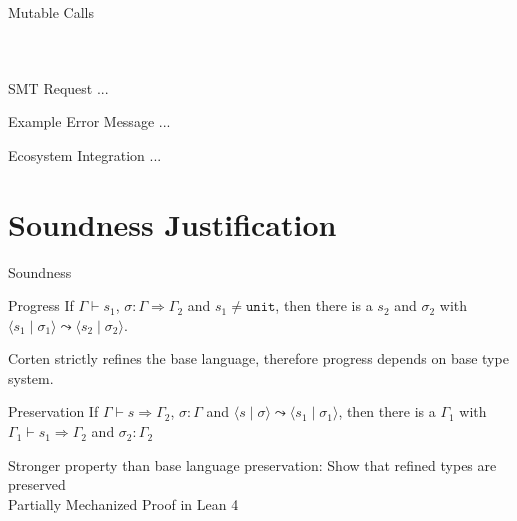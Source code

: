 \documentclass{sdqbeamer}
\newcommand{\code}[1]{\texttt{#1}}
\newcommand{\tuple}[2]{\langle #1 \mid #2 \rangle}
\begin{document}
\begin{frame}[fragile]{Mutable Calls}
  \begin{columns}
    \inputminted[]{rust}{./snippets/mut-arg-caller.rs}
    
  \end{columns}
\end{frame}

\begin{frame}{SMT Request}
  ...
\end{frame}


\begin{frame}{Example Error Message}
  ...
\end{frame}


\begin{frame}{Ecosystem Integration}
  ...
\end{frame}

\section{Soundness Justification}

\begin{frame}[fragile]{Soundness}
  \begin{greenblock}{Progress}
    If $\Gamma \vdash s_1$, $\sigma : \Gamma \Rightarrow \Gamma_2$ and $s_1 \neq \code{unit}$, then there is a $s_2$ and $\sigma_2$ with $\tuple{s_1}{\sigma_1} \leadsto \tuple{s_2}{\sigma_2}$.
  \end{greenblock}

  Corten strictly refines the base language, therefore progress depends on base type system.

  \begin{greenblock}{Preservation}
    If $\Gamma \vdash s \Rightarrow \Gamma_2$, $\sigma : \Gamma$ and $\tuple{s}{\sigma} \leadsto \tuple{s_1}{\sigma_1}$, then there is a $\Gamma_1$ with $\Gamma_1 \vdash s_1 \Rightarrow \Gamma_2$ and $\sigma_2 : \Gamma_2$
  \end{greenblock}

  Stronger property than base language preservation: Show that refined types are preserved\\
  
  Partially Mechanized Proof in Lean 4
\end{frame}
\end{document}
